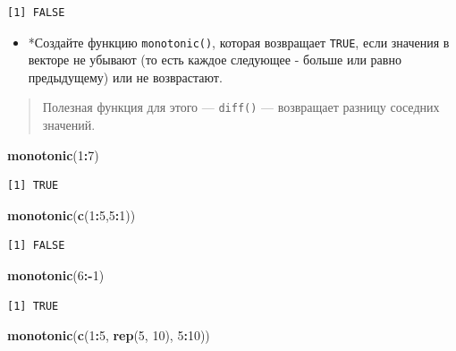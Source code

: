 \documentclass[
]{book}
\newenvironment{Shaded}{\begin{snugshade}}{\end{snugshade}}
\newcommand{\DecValTok}[1]{\textcolor[rgb]{0.00,0.00,0.81}{#1}}
\newcommand{\KeywordTok}[1]{\textcolor[rgb]{0.13,0.29,0.53}{\textbf{#1}}}
\newcommand{\NormalTok}[1]{#1}
\newcommand{\OperatorTok}[1]{\textcolor[rgb]{0.81,0.36,0.00}{\textbf{#1}}}
\providecommand{\tightlist}{%
  \setlength{\itemsep}{0pt}\setlength{\parskip}{0pt}}
\begin{document}
\begin{verbatim}
[1] FALSE
\end{verbatim}

\begin{itemize}
\tightlist
\item
  *Создайте функцию \texttt{monotonic()}, которая возвращает \texttt{TRUE}, если значения в векторе не убывают (то есть каждое следующее - больше или равно предыдущему) или не возврастают.
\end{itemize}

\begin{quote}
Полезная функция для этого --- \texttt{diff()} --- возвращает разницу соседних значений.
\end{quote}

\begin{Shaded}
\begin{Highlighting}[]
\KeywordTok{monotonic}\NormalTok{(}\DecValTok{1}\OperatorTok{:}\DecValTok{7}\NormalTok{)}
\end{Highlighting}
\end{Shaded}

\begin{verbatim}
[1] TRUE
\end{verbatim}

\begin{Shaded}
\begin{Highlighting}[]
\KeywordTok{monotonic}\NormalTok{(}\KeywordTok{c}\NormalTok{(}\DecValTok{1}\OperatorTok{:}\DecValTok{5}\NormalTok{,}\DecValTok{5}\OperatorTok{:}\DecValTok{1}\NormalTok{))}
\end{Highlighting}
\end{Shaded}

\begin{verbatim}
[1] FALSE
\end{verbatim}

\begin{Shaded}
\begin{Highlighting}[]
\KeywordTok{monotonic}\NormalTok{(}\DecValTok{6}\OperatorTok{:-}\DecValTok{1}\NormalTok{)}
\end{Highlighting}
\end{Shaded}

\begin{verbatim}
[1] TRUE
\end{verbatim}

\begin{Shaded}
\begin{Highlighting}[]
\KeywordTok{monotonic}\NormalTok{(}\KeywordTok{c}\NormalTok{(}\DecValTok{1}\OperatorTok{:}\DecValTok{5}\NormalTok{, }\KeywordTok{rep}\NormalTok{(}\DecValTok{5}\NormalTok{, }\DecValTok{10}\NormalTok{), }\DecValTok{5}\OperatorTok{:}\DecValTok{10}\NormalTok{))}
\end{Highlighting}
\end{Shaded}
\end{document}
